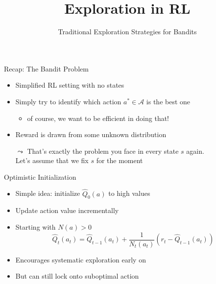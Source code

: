 \documentclass[aspectratio=169]{../latex_main/tntbeamer}  %
\title[RL: Exploration]{Exploration in RL}
\subtitle{Traditional Exploration Strategies for Bandits}
\begin{document}
	
	\maketitle

\begin{frame}[c]{Recap: The Bandit Problem}

\begin{itemize}
	\item Simplified RL setting with no states
	\item Simply try to identify which action $a^* \in \mathcal{A}$ is the best one
	\begin{itemize}
		\item of course, we want to be efficient in doing that!
	\end{itemize}
	\item Reward is drawn from some unknown distribution
	\bigskip
	\pause
	\item[$\leadsto$] That's exactly the problem you face in every state $s$ again.\\ Let's assume that we fix $s$ for the moment
\end{itemize}

\end{frame}
\begin{frame}[c]{Optimistic Initialization}
	
	\begin{itemize}
		\item Simple idea: initialize $\hat{Q}_0(a)$ to high values
		\item Update action value incrementally
		\item Starting with $N(a) > 0$
		$$\hat{Q}_t(a_t) = \hat{Q}_{t-1}(a_t) + \frac{1}{N_t(a_t)} (r_t - \hat{Q}_{t-1}(a_t))$$
		\item Encourages systematic exploration early on
		\item But can still lock onto suboptimal action
	\end{itemize}
	
\end{frame}
\end{document}
